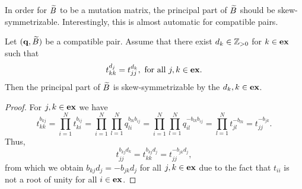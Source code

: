 In order for $\widetilde{B}$ to be a mutation matrix, the principal part of $\widetilde{B}$ should be
skew-symmetrizable. Interestingly, this is almost automatic for compatible pairs.
\begin{lemma}\label{lem:principal_part_skew_symmetrizable}

	Let $(\mathbf{q}, \widetilde{B})$ be a compatible pair. Assume that there exist $d_k \in \mathbb{Z}_{>0}$ for
	$k \in \mathbf{ex}$ such that
	\begin{equation*}
		t_{kk}^{d_j} = t_{jj}^{d_k}, \text{ for all } j,k \in \mathbf{ex}.
	\end{equation*}
	Then the principal part of $\widetilde{B}$ is skew-symmetrizable by the $d_k, k\in \mathbf{ex}$.
\end{lemma}
\begin{proof}

	For $j,k \in \mathbf{ex}$ we have
	\begin{equation*}
		t_{kk}^{b_{kj}} = \prod_{i=1}^N t_{ki}^{b_{ij}} = \prod_{i=1}^N\prod_{l=1}^N q_{li}^{b_{lk}b_{ij}} =
		\prod_{i=1}^N\prod_{l=1}^N q_{il}^{-b_{lk}b_{ij}} = \prod_{l=1}^N t_{jl}^{-b_{lk}} = t_{jj}^{-b_{jk}}.
	\end{equation*}
	Thus,
	\begin{equation*}
		t_{jj}^{b_{kj} d_k} = t_{kk}^{ b_{kj}d_j} = t_{jj}^{- b_{jk} d_j},
	\end{equation*}
	from which we obtain $b_{kj} d_j = -b_{jk} d_j$ for all $j, k \in \mathbf{ex}$ due to the fact that $t_{ii}$ is not a root of unity for all $i \in \mathbf{ex}$.
\end{proof}


